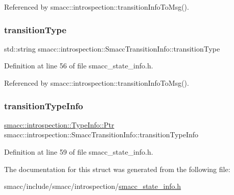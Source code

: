 Referenced by smacc\+::introspection\+::transition\+Info\+To\+Msg().

\mbox{\label{structsmacc_1_1introspection_1_1SmaccTransitionInfo_a8f4682c18a3b6c09f6b942a4fa7b524d}} 
\subsubsection{\texorpdfstring{transition\+Type}{transitionType}}
{\footnotesize\ttfamily std\+::string smacc\+::introspection\+::\+Smacc\+Transition\+Info\+::transition\+Type}



Definition at line 56 of file smacc\+\_\+state\+\_\+info.\+h.



Referenced by smacc\+::introspection\+::transition\+Info\+To\+Msg().

\mbox{\label{structsmacc_1_1introspection_1_1SmaccTransitionInfo_a98364c74dec9e1cf1337743ce0771a33}} 
\subsubsection{\texorpdfstring{transition\+Type\+Info}{transitionTypeInfo}}
{\footnotesize\ttfamily \hyperlink{classsmacc_1_1introspection_1_1TypeInfo_aa6ffd9c39811d59f7c771941b7fad860}{smacc\+::introspection\+::\+Type\+Info\+::\+Ptr} smacc\+::introspection\+::\+Smacc\+Transition\+Info\+::transition\+Type\+Info}



Definition at line 59 of file smacc\+\_\+state\+\_\+info.\+h.



The documentation for this struct was generated from the following file\+:\begin{DoxyCompactItemize}
\item 
smacc/include/smacc/introspection/\hyperlink{smacc__state__info_8h}{smacc\+\_\+state\+\_\+info.\+h}\end{DoxyCompactItemize}
